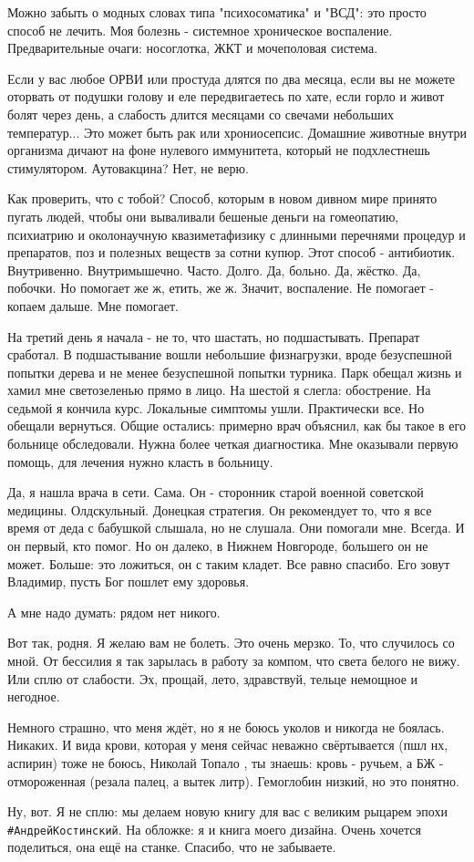 Можно забыть о модных словах типа "психосоматика" и "ВСД": это просто способ не
лечить. Моя болезнь - системное хроническое воспаление. Предварительные очаги:
носоглотка, ЖКТ и мочеполовая система. 

Если у вас любое ОРВИ или простуда длятся по два месяца, если вы не можете
оторвать от подушки голову и еле передвигаетесь по хате, если горло и живот
болят через день, а слабость длится месяцами со свечами небольших температур...
Это может быть рак или хрониосепсис. Домашние животные внутри организма дичают
на фоне нулевого иммунитета, который не подхлестнешь стимулятором. Аутовакцина?
Нет, не верю. 

Как проверить, что с тобой? Способ, которым в новом дивном мире принято пугать
людей, чтобы они вываливали бешеные деньги на гомеопатию, психиатрию и
околонаучную квазиметафизику с длинными перечнями процедур и препаратов, поз и
полезных веществ за сотни купюр. Этот способ - антибиотик. Внутривенно.
Внутримышечно. Часто. Долго. Да, больно. Да, жёстко. Да, побочки. Но помогает
же ж, етить, же ж. Значит, воспаление. Не помогает - копаем дальше. Мне
помогает.

На третий день я начала - не то, что шастать, но подшастывать. Препарат
сработал. В подшастывание вошли небольшие физнагрузки, вроде безуспешной
попытки дерева и не менее безуспешной попытки турника. Парк обещал жизнь и
хамил мне светозеленью прямо в лицо. На шестой я слегла: обострение. На седьмой
я кончила курс. Локальные симптомы ушли. Практически все. Но обещали вернуться.
Общие остались: примерно врач объяснил, как бы такое в его больнице
обследовали. Нужна более четкая диагностика. Мне оказывали первую помощь, для
лечения нужно класть в больницу.

Да, я нашла врача в сети. Сама. Он - сторонник старой военной советской
медицины. Олдскульный. Донецкая стратегия. Он рекомендует то, что я все время
от деда с бабушкой слышала, но не слушала. Они помогали мне. Всегда. И он
первый, кто помог. Но он далеко, в Нижнем Новгороде, большего он не может.
Больше: это ложиться, он с таким кладет. Все равно спасибо. Его зовут Владимир,
пусть Бог пошлет ему здоровья. 

А мне надо думать: рядом нет никого. 

Вот так, родня. Я желаю вам не болеть. Это очень мерзко. То, что случилось со
мной. От бессилия я так зарылась в работу за компом, что света белого не вижу.
Или сплю от слабости. Эх, прощай, лето, здравствуй, тельце немощное и негодное. 

Немного страшно, что меня ждёт, но я не боюсь уколов и никогда не боялась.
Никаких. И вида крови, которая у меня сейчас неважно свёртывается (пшл нх,
аспирин) тоже не боюсь, Николай Топало , ты знаешь: кровь - ручьем, а БЖ -
отмороженная (резала палец, а вытек литр). Гемоглобин низкий, но это понятно. 

Ну, вот. Я не сплю: мы делаем новую книгу для вас с великим рыцарем эпохи
\verb|#АндрейКостинский|. На обложке: я и книга моего дизайна. Очень хочется
поделиться, она ещё на станке. Спасибо, что не забываете.

